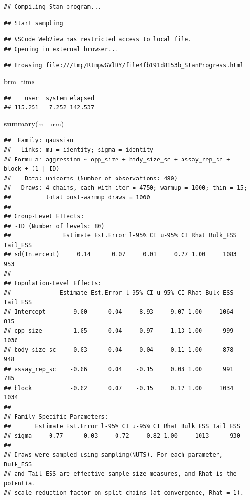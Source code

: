 \documentclass[
  12pt,
]{book}
\newenvironment{Shaded}{\begin{snugshade}}{\end{snugshade}}
\newcommand{\KeywordTok}[1]{\textcolor[rgb]{0.13,0.29,0.53}{\textbf{#1}}}
\newcommand{\NormalTok}[1]{#1}
\begin{document}
\begin{verbatim}
## Compiling Stan program...
\end{verbatim}

\begin{verbatim}
## Start sampling
\end{verbatim}

\begin{verbatim}
## VSCode WebView has restricted access to local file.
## Opening in external browser...
\end{verbatim}

\begin{verbatim}
## Browsing file:///tmp/RtmpwGVlDY/file4fb191d8153b_StanProgress.html
\end{verbatim}

\begin{Shaded}
\begin{Highlighting}[]
\NormalTok{brm\_time}
\end{Highlighting}
\end{Shaded}

\begin{verbatim}
##    user  system elapsed 
## 115.251   7.252 142.537
\end{verbatim}

\begin{Shaded}
\begin{Highlighting}[]
\KeywordTok{summary}\NormalTok{(m\_brm)}
\end{Highlighting}
\end{Shaded}

\begin{verbatim}
##  Family: gaussian 
##   Links: mu = identity; sigma = identity 
## Formula: aggression ~ opp_size + body_size_sc + assay_rep_sc + block + (1 | ID) 
##    Data: unicorns (Number of observations: 480) 
##   Draws: 4 chains, each with iter = 4750; warmup = 1000; thin = 15;
##          total post-warmup draws = 1000
## 
## Group-Level Effects: 
## ~ID (Number of levels: 80) 
##               Estimate Est.Error l-95% CI u-95% CI Rhat Bulk_ESS Tail_ESS
## sd(Intercept)     0.14      0.07     0.01     0.27 1.00     1083      953
## 
## Population-Level Effects: 
##              Estimate Est.Error l-95% CI u-95% CI Rhat Bulk_ESS Tail_ESS
## Intercept        9.00      0.04     8.93     9.07 1.00     1064      815
## opp_size         1.05      0.04     0.97     1.13 1.00      999     1030
## body_size_sc     0.03      0.04    -0.04     0.11 1.00      878      948
## assay_rep_sc    -0.06      0.04    -0.15     0.03 1.00      991      785
## block           -0.02      0.07    -0.15     0.12 1.00     1034     1034
## 
## Family Specific Parameters: 
##       Estimate Est.Error l-95% CI u-95% CI Rhat Bulk_ESS Tail_ESS
## sigma     0.77      0.03     0.72     0.82 1.00     1013      930
## 
## Draws were sampled using sampling(NUTS). For each parameter, Bulk_ESS
## and Tail_ESS are effective sample size measures, and Rhat is the potential
## scale reduction factor on split chains (at convergence, Rhat = 1).
\end{verbatim}
\end{document}
